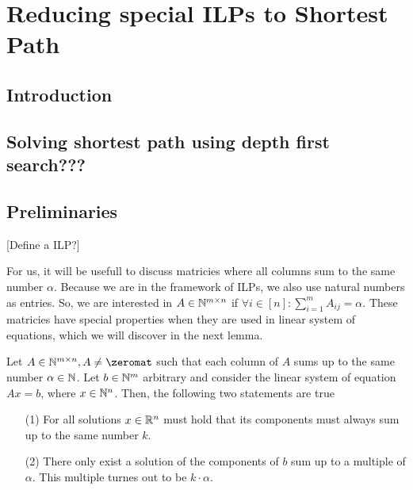 \chapter{Reducing special ILPs to Shortest Path}
\section{Introduction}

\section{Solving shortest path using depth first search???}

\section{Preliminaries}
[Define a ILP?]

For us, it will be usefull to discuss matricies where all columns sum to the same number $\alpha$. Because we are in the framework of ILPs, we also use natural numbers as entries. So, we are interested in $A \in \mathbb{N}^{m \times n}$ if $\forall i \in [n]\colon \sum_{i=1}^{m}A_{ij} = \alpha$. These matricies have special properties when they are used in linear system of equations, which we will discover in the next lemma.

\begin{lemma}
    \label{lemma:ilp_pre1}
    Let $A\in \N^{m \times n}, A \neq \zeromat$ such that each column of $A$ sums up to the same number $\alpha \in \mathbb{N}$. Let $b \in \mathbb{N}^m$ arbitrary and consider the linear system of equation $Ax=b$, where $x \in \mathbb{N}^n$. Then, the following two statements are true

    \begin{enumerate}
        \item[(1)] For all solutions $x \in \mathbb{R}^n$ must hold that its components must always sum up to the same number $k$.
        \item[(2)] There only exist a solution of the components of $b$ sum up to a multiple of $\alpha$. This multiple turnes out to be $k \cdot \alpha$.
    \end{enumerate}
\end{lemma}

